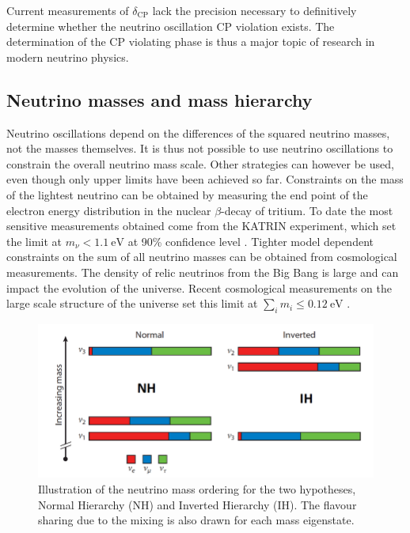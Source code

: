 Current measurements of $\delta_\text{CP}$ lack the precision necessary to definitively determine whether the neutrino oscillation CP violation exists. The determination of the CP violating phase is thus a major topic of research in modern neutrino physics.

\subsection{Neutrino masses and mass hierarchy}
\label{Sec:Neutrinomasses}

Neutrino oscillations depend on the differences of the squared neutrino masses, not the masses themselves. It is thus not possible to use neutrino oscillations to constrain the overall neutrino mass scale. Other strategies can however be used, even though only upper limits have been achieved so far. Constraints on the mass of the lightest neutrino can be obtained by measuring the end point of the electron energy distribution in the nuclear $\beta$-decay of tritium. To date the most sensitive measurements obtained come from the KATRIN experiment, which set the limit at $m_\nu<1.1 \ \text{eV}$ at 90\% confidence level \cite{KATRIN:2019yun}. Tighter model dependent constraints on the sum of all neutrino masses can be obtained from cosmological measurements. The density of relic neutrinos from the Big Bang is large and can impact the evolution of the universe. Recent cosmological measurements on the large scale structure of the universe set this limit at $\sum_i m_{i}\leq0.12 \ \text{eV}$ \cite{Gariazzo:2024beg}.

\begin{figure}
    \centering
    \includegraphics[width=0.75\linewidth]{figures//ch2-Theory/MassOrder.png}
    \caption[Illustration of the neutrino mass ordering.]{Illustration of the neutrino mass ordering for the two hypotheses, Normal Hierarchy (NH) and Inverted Hierarchy (IH). The flavour sharing due to the mixing is also drawn for each mass eigenstate.  
 \cite{Stanco:2016usn}}
    \label{fig:MassOrdering}
\end{figure}

